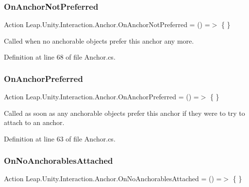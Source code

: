 \subsubsection{\texorpdfstring{OnAnchorNotPreferred}{OnAnchorNotPreferred}}
{\footnotesize\ttfamily Action Leap.\+Unity.\+Interaction.\+Anchor.\+On\+Anchor\+Not\+Preferred = () =$>$ \{ \}}



Called when no anchorable objects prefer this anchor any more. 



Definition at line 68 of file Anchor.\+cs.

\mbox{\label{class_leap_1_1_unity_1_1_interaction_1_1_anchor_aa38b7abb27aec5bc6b81b417f735d572}} 
\subsubsection{\texorpdfstring{OnAnchorPreferred}{OnAnchorPreferred}}
{\footnotesize\ttfamily Action Leap.\+Unity.\+Interaction.\+Anchor.\+On\+Anchor\+Preferred = () =$>$ \{ \}}



Called as soon as any anchorable objects prefer this anchor if they were to try to attach to an anchor. 



Definition at line 63 of file Anchor.\+cs.

\mbox{\label{class_leap_1_1_unity_1_1_interaction_1_1_anchor_a5c735581eb8e1e360c0d46accfa5c38e}} 
\subsubsection{\texorpdfstring{OnNoAnchorablesAttached}{OnNoAnchorablesAttached}}
{\footnotesize\ttfamily Action Leap.\+Unity.\+Interaction.\+Anchor.\+On\+No\+Anchorables\+Attached = () =$>$ \{ \}}



